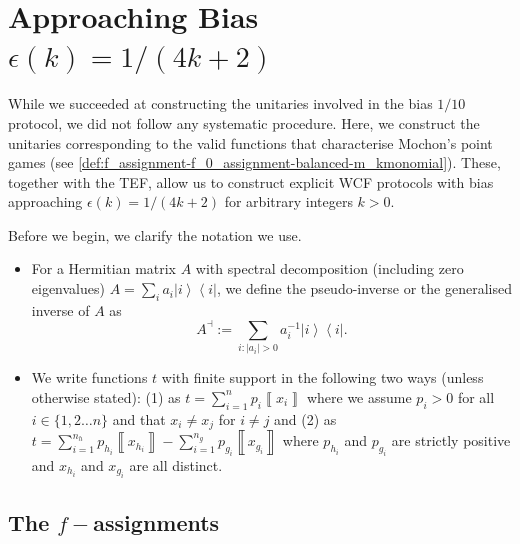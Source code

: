 \documentclass{article}
\begin{document}
%
%
%
\section{Approaching Bias \texorpdfstring{$\epsilon(k)=1/(4k+2)$}{epsilon(k)=1/(4k+2)}} \label{sec:1by4k+2}

While we succeeded at constructing the unitaries involved in the bias
$1/10$ protocol, we did not follow any systematic procedure. Here,
we construct the unitaries corresponding to the valid functions that characterise  Mochon's  point games
(see \cref{def:f_assignment-f_0_assignment-balanced-m_kmonomial}).
%
These, together with the TEF, allow us to construct explicit WCF protocols with bias approaching $\epsilon(k)=1/(4k+2)$ for arbitrary integers
$k>0$.

%
Before we begin, we clarify the notation we use. %
%
%

\begin{itemize}
  \item For a Hermitian matrix $A$ with spectral decomposition (including zero eigenvalues) $A=\sum_{i}a_{i}\left|i\right\rangle \left\langle i\right|$, we define
        the pseudo-inverse or the generalised inverse of $A$ as $$A^{\dashv}:=\sum_{i:\left|a_{i}\right|>0}a_{i}^{-1}\left|i\right\rangle \left\langle i\right|.$$
  \item We write functions
        $t$ with finite support in the following two ways (unless otherwise stated): (1) as $t=\sum_{i=1}^{n}p_{i}\left\llbracket x_{i}\right\rrbracket $
        where we assume $p_{i}>0$ for all $i\in\{1,2\dots n\}$ and that
        $x_{i}\neq x_{j}$ for $i\neq j$ and (2) as $t=\sum_{i=1}^{n_{h}}p_{h_{i}}\left\llbracket x_{h_{i}}\right\rrbracket -\sum_{i=1}^{n_{g}}p_{g_{i}}\left\llbracket x_{g_{i}}\right\rrbracket $
        where $p_{h_{i}}$ and $p_{g_{i}}$ are strictly positive and $x_{h_{i}}$
        and $x_{g_{i}}$ are all distinct.

\end{itemize}

\subsection{The \texorpdfstring{$f-$}{f-}assignments}\label{subsec:fassignmentequivmonomial}
\end{document}
